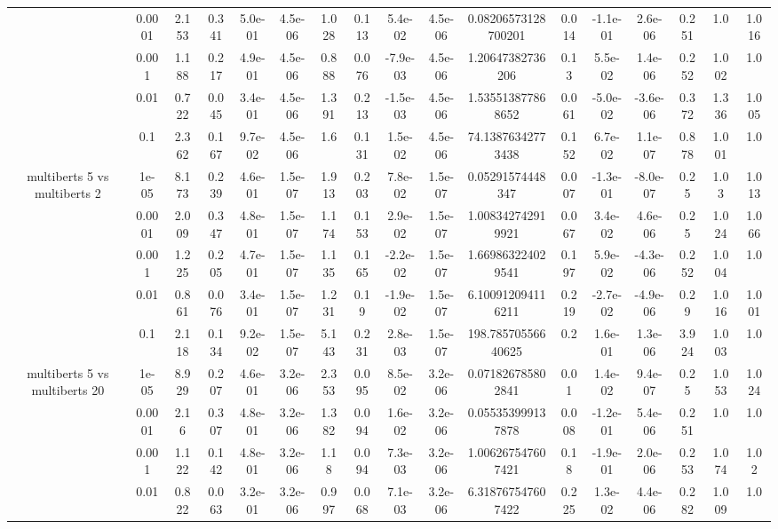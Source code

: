 \begin{tabular}{|c|c|c|c|c|c|c|c|c|c|c|c|c|c|c|c|c|}
 & 0.0001 & 2.153 & 0.341 & 5.0e-01 & 4.5e-06 & 1.028 & 0.113 & 5.4e-02 & 4.5e-06 & 0.08206573128700201 & 0.014 & -1.1e-01 & 2.6e-06 & 0.251 & 1.0 & 1.016 \\
 & 0.001 & 1.188 & 0.217 & 4.9e-01 & 4.5e-06 & 0.888 & 0.076 & -7.9e-03 & 4.5e-06 & 1.20647382736206 & 0.13 & 5.5e-02 & 1.4e-06 & 0.252 & 1.002 & 1.0 \\
 & 0.01 & 0.722 & 0.045 & 3.4e-01 & 4.5e-06 & 1.391 & 0.213 & -1.5e-03 & 4.5e-06 & 1.535513877868652 & 0.061 & -5.0e-02 & -3.6e-06 & 0.372 & 1.336 & 1.005 \\
 & 0.1 & 2.362 & 0.167 & 9.7e-02 & 4.5e-06 & 1.6 & 0.131 & 1.5e-02 & 4.5e-06 & 74.13876342773438 & 0.152 & 6.7e-02 & 1.1e-07 & 0.878 & 1.001 & 1.0 \\
\hline
\multirow{5}{*}{multiberts 5 vs multiberts 2} & 1e-05 & 8.173 & 0.239 & 4.6e-01 & 1.5e-07 & 1.913 & 0.203 & 7.8e-02 & 1.5e-07 & 0.05291574448347 & 0.007 & -1.3e-01 & -8.0e-07 & 0.25 & 1.03 & 1.013 \\
 & 0.0001 & 2.009 & 0.347 & 4.8e-01 & 1.5e-07 & 1.174 & 0.153 & 2.9e-02 & 1.5e-07 & 1.008342742919921 & 0.067 & 3.4e-02 & 4.6e-06 & 0.25 & 1.024 & 1.066 \\
 & 0.001 & 1.225 & 0.205 & 4.7e-01 & 1.5e-07 & 1.135 & 0.165 & -2.2e-02 & 1.5e-07 & 1.669863224029541 & 0.197 & 5.9e-02 & -4.3e-06 & 0.252 & 1.004 & 1.0 \\
 & 0.01 & 0.861 & 0.076 & 3.4e-01 & 1.5e-07 & 1.231 & 0.19 & -1.9e-02 & 1.5e-07 & 6.100912094116211 & 0.219 & -2.7e-02 & -4.9e-06 & 0.29 & 1.016 & 1.001 \\
 & 0.1 & 2.118 & 0.134 & 9.2e-02 & 1.5e-07 & 5.143 & 0.231 & 2.8e-03 & 1.5e-07 & 198.78570556640625 & 0.2 & 1.6e-01 & 1.3e-06 & 3.924 & 1.003 & 1.0 \\
\hline
\multirow{5}{*}{multiberts 5 vs multiberts 20} & 1e-05 & 8.929 & 0.207 & 4.6e-01 & 3.2e-06 & 2.353 & 0.095 & 8.5e-02 & 3.2e-06 & 0.071826785802841 & 0.01 & 1.4e-02 & 9.4e-07 & 0.25 & 1.053 & 1.024 \\
 & 0.0001 & 2.16 & 0.307 & 4.8e-01 & 3.2e-06 & 1.382 & 0.094 & 1.6e-02 & 3.2e-06 & 0.055353999137878 & 0.008 & -1.2e-01 & 5.4e-06 & 0.251 & 1.0 & 1.0 \\
 & 0.001 & 1.122 & 0.142 & 4.8e-01 & 3.2e-06 & 1.18 & 0.094 & 7.3e-03 & 3.2e-06 & 1.006267547607421 & 0.18 & -1.9e-01 & 2.0e-06 & 0.253 & 1.074 & 1.02 \\
 & 0.01 & 0.822 & 0.063 & 3.2e-01 & 3.2e-06 & 0.997 & 0.068 & 7.1e-03 & 3.2e-06 & 6.318767547607422 & 0.225 & 1.3e-02 & 4.4e-06 & 0.282 & 1.009 & 1.0 \\

\end{tabular}
